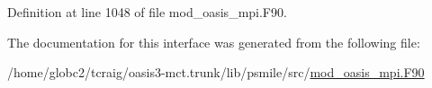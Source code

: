 Definition at line 1048 of file mod\+\_\+oasis\+\_\+mpi.\+F90.



The documentation for this interface was generated from the following file\+:\begin{DoxyCompactItemize}
\item 
/home/globc2/tcraig/oasis3-\/mct.\+trunk/lib/psmile/src/\hyperlink{mod__oasis__mpi_8_f90}{mod\+\_\+oasis\+\_\+mpi.\+F90}\end{DoxyCompactItemize}
